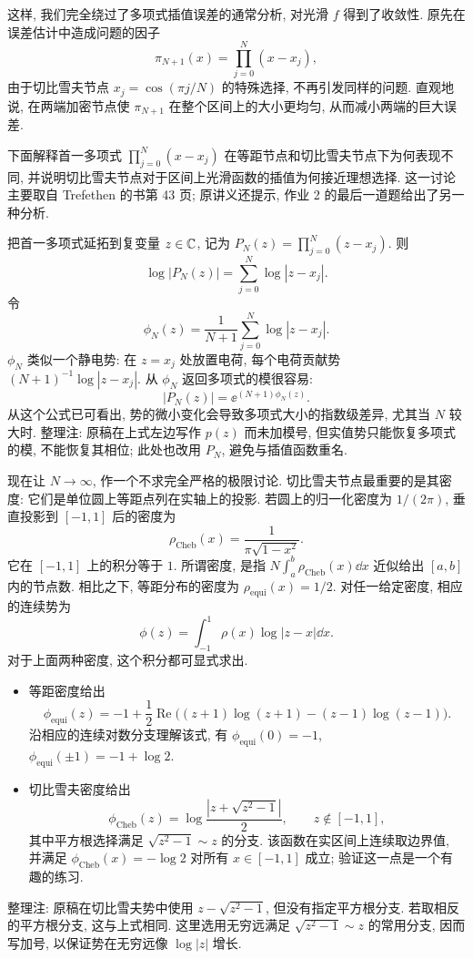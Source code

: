 这样, 我们完全绕过了多项式插值误差的通常分析, 对光滑 $f$ 得到了收敛性. 原先在误差估计中造成问题的因子
\[
\pi_{N+1}(x)=\prod_{j=0}^{N}(x-x_j),
\]
由于切比雪夫节点 $x_j=\cos(\pi j/N)$ 的特殊选择, 不再引发同样的问题. 直观地说, 在两端加密节点使 $\pi_{N+1}$ 在整个区间上的大小更均匀, 从而减小两端的巨大误差.

下面解释首一多项式 $\prod_{j=0}^{N}(x-x_j)$ 在等距节点和切比雪夫节点下为何表现不同, 并说明切比雪夫节点对于区间上光滑函数的插值为何接近理想选择. 这一讨论主要取自 Trefethen 的书第 43 页; 原讲义还提示, 作业 2 的最后一道题给出了另一种分析.

把首一多项式延拓到复变量 $z\in\mathbb C$, 记为 $P_N(z)=\prod_{j=0}^{N}(z-x_j)$. 则
\[
\log|P_N(z)|=\sum_{j=0}^{N}\log|z-x_j|.
\]
令
\[
\phi_N(z)=\frac1{N+1}\sum_{j=0}^{N}\log|z-x_j|.
\]
$\phi_N$ 类似一个静电势: 在 $z=x_j$ 处放置电荷, 每个电荷贡献势 $(N+1)^{-1}\log|z-x_j|$. 从 $\phi_N$ 返回多项式的模很容易:
\[
|P_N(z)|=\ee^{(N+1)\phi_N(z)}.
\]
从这个公式已可看出, 势的微小变化会导致多项式大小的指数级差异, 尤其当 $N$ 较大时. 整理注: 原稿在上式左边写作 $p(z)$ 而未加模号, 但实值势只能恢复多项式的模, 不能恢复其相位; 此处也改用 $P_N$, 避免与插值函数重名.

现在让 $N\to\infty$, 作一个不求完全严格的极限讨论. 切比雪夫节点最重要的是其密度: 它们是单位圆上等距点列在实轴上的投影. 若圆上的归一化密度为 $1/(2\pi)$, 垂直投影到 $[-1,1]$ 后的密度为
\[
\rho_{\mathrm{Cheb}}(x)=\frac1{\pi\sqrt{1-x^2}}.
\]
它在 $[-1,1]$ 上的积分等于 $1$. 所谓密度, 是指 $N\int_a^b\rho_{\mathrm{Cheb}}(x)\dd x$ 近似给出 $[a,b]$ 内的节点数. 相比之下, 等距分布的密度为 $\rho_{\mathrm{equi}}(x)=1/2$. 对任一给定密度, 相应的连续势为
\[
\phi(z)=\int_{-1}^{1}\rho(x)\log|z-x|\dd x.
\]
对于上面两种密度, 这个积分都可显式求出.
\begin{itemize}
\item 等距密度给出
\[
\phi_{\mathrm{equi}}(z)=-1+
\frac12\operatorname{Re}\bigl((z+1)\log(z+1)-(z-1)\log(z-1)\bigr).
\]
沿相应的连续对数分支理解该式, 有 $\phi_{\mathrm{equi}}(0)=-1$,
$\phi_{\mathrm{equi}}(\pm1)=-1+\log2$.
\item 切比雪夫密度给出
\[
\phi_{\mathrm{Cheb}}(z)=\log\frac{|z+\sqrt{z^2-1}|}{2},
\qquad z\notin[-1,1],
\]
其中平方根选择满足 $\sqrt{z^2-1}\sim z$ 的分支. 该函数在实区间上连续取边界值, 并满足 $\phi_{\mathrm{Cheb}}(x)=-\log2$ 对所有 $x\in[-1,1]$ 成立; 验证这一点是一个有趣的练习.
\end{itemize}
\begin{remark}
整理注: 原稿在切比雪夫势中使用 $z-\sqrt{z^2-1}$, 但没有指定平方根分支. 若取相反的平方根分支, 这与上式相同. 这里选用无穷远满足 $\sqrt{z^2-1}\sim z$ 的常用分支, 因而写加号, 以保证势在无穷远像 $\log|z|$ 增长.
\end{remark}

